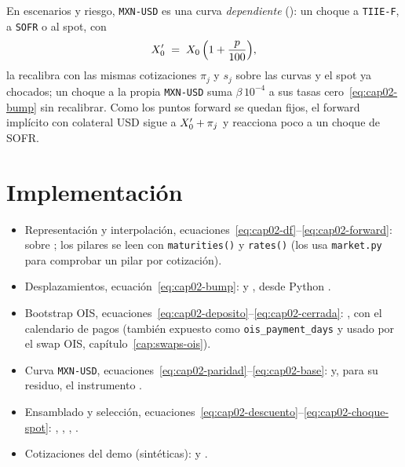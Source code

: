 En escenarios y riesgo, \texttt{MXN-USD} es una curva \emph{dependiente}
(): un choque a \texttt{TIIE-F}, a \texttt{SOFR} o al spot, con
\begin{equation}\label{eq:cap02-choque-spot}
  X_0' \;=\; X_0\,\Bigl(1+\frac{p}{100}\Bigr),
\end{equation}
la recalibra con las mismas cotizaciones $\pi_j$ y $s_j$ sobre las curvas y el spot ya chocados; un choque a la
propia \texttt{MXN-USD} suma $\beta\,10^{-4}$ a sus tasas cero~\eqref{eq:cap02-bump} sin recalibrar. Como los
puntos forward se quedan fijos, el forward implícito con colateral USD sigue a $X_0'+\pi_j$ y reacciona poco a un
choque de SOFR.

\section{Implementación}\label{sec:cap02-implementacion}

{\raggedright
\begin{itemize}
  \item Representación y interpolación, ecuaciones~\eqref{eq:cap02-df}--\eqref{eq:cap02-forward}:
         sobre
        ; los pilares se leen con \texttt{maturities()} y
        \texttt{rates()} (los usa \texttt{market.py} para comprobar un pilar por cotización).
  \item Desplazamientos, ecuación~\eqref{eq:cap02-bump}:
         y
        , desde Python
        .
  \item Bootstrap OIS, ecuaciones~\eqref{eq:cap02-deposito}--\eqref{eq:cap02-cerrada}:
        , con el calendario de pagos
         (también expuesto como
        \texttt{ois\_payment\_days} y usado por el swap OIS, capítulo~\ref{cap:swaps-ois}).
  \item Curva \texttt{MXN-USD}, ecuaciones~\eqref{eq:cap02-paridad}--\eqref{eq:cap02-base}:
         y, para su residuo, el instrumento
        .
  \item Ensamblado y selección, ecuaciones~\eqref{eq:cap02-descuento}--\eqref{eq:cap02-choque-spot}:
        , ,
        , .
  \item Cotizaciones del demo (sintéticas):  y
        .
\end{itemize}
}

